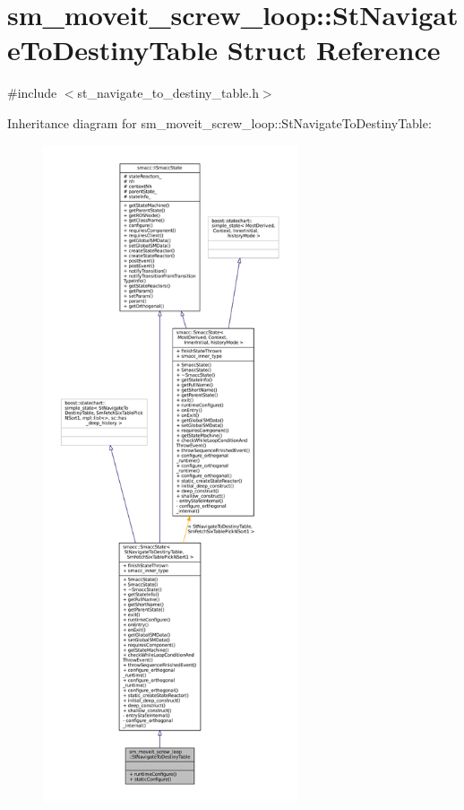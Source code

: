 \hypertarget{structsm__moveit__screw__loop_1_1StNavigateToDestinyTable}{}\section{sm\+\_\+moveit\+\_\+screw\+\_\+loop\+:\+:St\+Navigate\+To\+Destiny\+Table Struct Reference}
\label{structsm__moveit__screw__loop_1_1StNavigateToDestinyTable}


{\ttfamily \#include $<$st\+\_\+navigate\+\_\+to\+\_\+destiny\+\_\+table.\+h$>$}



Inheritance diagram for sm\+\_\+moveit\+\_\+screw\+\_\+loop\+:\+:St\+Navigate\+To\+Destiny\+Table\+:
\nopagebreak
\begin{figure}[H]
\begin{center}
\leavevmode
\includegraphics[height=550pt]{structsm__moveit__screw__loop_1_1StNavigateToDestinyTable__inherit__graph}
\end{center}
\end{figure}


